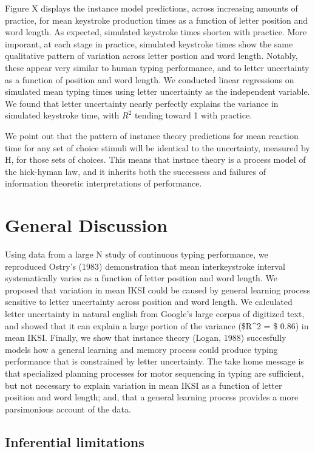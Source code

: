 \documentclass[floatsintext,man]{apa6}
\theoremstyle{definition}
\theoremstyle{definition}
\theoremstyle{definition}
\theoremstyle{remark}
\begin{document}
Figure X displays the instance model predictions, across increasing
amounts of practice, for mean keystroke production times as a function
of letter position and word length. As expected, simulated keystroke
times shorten with practice. More imporant, at each stage in practice,
simulated keystroke times show the same qualitative pattern of variation
across letter postion and word length. Notably, these appear very
similar to human typing performance, and to letter uncertainty as a
function of position and word length. We conducted linear regressions on
simulated mean typing times using letter uncertainty as the independent
variable. We found that letter uncertainty nearly perfectly explains the
variance in simulated keystroke time, with \(R^2\) tending toward 1 with
practice.

We point out that the pattern of instance theory predictions for mean
reaction time for any set of choice stimuli will be identical to the
uncertainty, measured by H, for those sets of choices. This means that
instnce theory is a process model of the hick-hyman law, and it inherits
both the successess and failures of information theoretic
interpretations of performance.

\section{General Discussion}\label{general-discussion}

Using data from a large N study of continuous typing performance, we
reproduced Ostry's (1983) demonstration that mean interkeystroke
interval systematically varies as a function of letter position and word
length. We proposed that variation in mean IKSI could be caused by
general learning process sensitive to letter uncertainty across position
and word length. We calculated letter uncertainty in natural english
from Google's large corpus of digitized text, and showed that it can
explain a large portion of the variance (\$R\^{}2 = \$ 0.86) in mean
IKSI. Finally, we show that instance theory (Logan, 1988) succesfully
models how a general learning and memory process could produce typing
performance that is constrained by letter uncertainty. The take home
message is that specialized planning processes for motor sequencing in
typing are sufficient, but not necessary to explain variation in mean
IKSI as a function of letter position and word length; and, that a
general learning process provides a more parsimonious account of the
data.

\subsection{Inferential limitations}\label{inferential-limitations}
\end{document}
